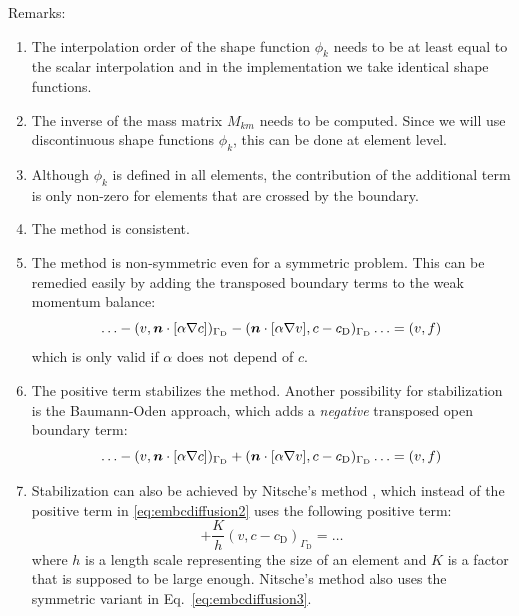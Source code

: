 Remarks:
\begin{enumerate}
   \item The interpolation order of the shape function $\phi_k$ needs to be at
least equal to the scalar interpolation and in the implementation we
 take identical shape functions.
   \item The inverse of the mass matrix $M_{km}$ needs to be computed. Since we
will use discontinuous shape functions $\phi_k$, this can be done at element
level.
   \item Although $\phi_k$ is defined in all elements, the contribution of the
additional term is only non-zero for elements that are crossed by the boundary.
   \item The method is consistent.
\item
The method is non-symmetric even for a symmetric problem.
This can be remedied
easily by adding the transposed boundary terms to the
weak momentum balance:
\begin{equation}
\ldots
            -(v,\boldsymbol{n}\cdot[\alpha\nabla c])_{\Gamma_{\text{D}}}
            -(\boldsymbol{n}\cdot[\alpha\nabla v],c- c_\text{D})_{\Gamma_{\text{D}}}
         \ldots =(v,f)
\label{eq:embcdiffusion3}
\end{equation}
which is only valid if $\alpha$ does not depend of $c$.
   \item The positive term stabilizes the method. Another possibility for
stabilization is the Baumann-Oden approach, which adds a \emph{negative}
         transposed open boundary term:
\begin{equation}
  \ldots
            -(v,\boldsymbol{n}\cdot[\alpha\nabla c])_{\Gamma_{\text{D}}}
            +(\boldsymbol{n}\cdot[\alpha\nabla v],c- c_\text{D})_{\Gamma_{\text{D}}}
  \ldots
         =(v,f)
\label{eq:embcdiffusion_bau}
\end{equation}
  \item
Stabilization can also be achieved by 
Nitsche's method \cite{Nitsche71}, which instead of the positive term
in \eqref{eq:embcdiffusion2} uses the following positive term:
\begin{equation}
   + \frac{K}{h}(v, c-c_\text{D})_{\Gamma_\text{D}} = \ldots
\end{equation}
where $h$ is a length scale representing the size of an element and
$K$ is a factor that is supposed to be large enough. Nitsche's method also
uses the symmetric variant in Eq.~\eqref{eq:embcdiffusion3}.

\end{enumerate}

